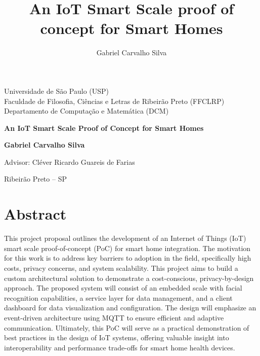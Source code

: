 \documentclass[12pt]{article}
\title{An IoT Smart Scale proof of concept for Smart Homes}
\author{Gabriel Carvalho Silva\inst{1}}
\begin{document}
 

\begin{titlepage}
    \centering
    \vspace*{2cm}
    
    {\Large Universidade de São Paulo (USP)}\\
    \vspace{0.5cm}
    {\large Faculdade de Filosofia, Ciências e Letras de Ribeirão Preto (FFCLRP)}\\
    \vspace{0.3cm}
    {\large Departamento de Computação e Matemática (DCM)}\\
    
    \vspace{4cm}
    
    {\huge \textbf{An IoT Smart Scale Proof of Concept for Smart Homes}}\\
    
    \vspace{4cm}
    
    {\Large \textbf{Gabriel Carvalho Silva}}\\
    
    \vspace{2cm}
    
    {\large Advisor: Cléver Ricardo Guareis de Farias}\\
    
    \vfill
    
    {\large Ribeirão Preto -- SP}\\
    {\large \the\year}
    
\end{titlepage}

\newpage

\section*{Abstract}

This project proposal outlines the development of an Internet of Things (IoT) smart scale proof-of-concept (PoC) for smart home integration. The motivation for this work is to address key barriers to adoption in the field, specifically high costs, privacy concerns, and system scalability. This project aims to build a custom architectural solution to demonstrate a cost-conscious, privacy-by-design approach. The proposed system will consist of an embedded scale with facial recognition capabilities, a service layer for data management, and a client dashboard for data visualization and configuration. The design will emphasize an event-driven architecture using MQTT to ensure efficient and adaptive communication. Ultimately, this PoC will serve as a practical demonstration of best practices in the design of IoT systems, offering valuable insight into interoperability and performance trade-offs for smart home health devices.
\end{document}
